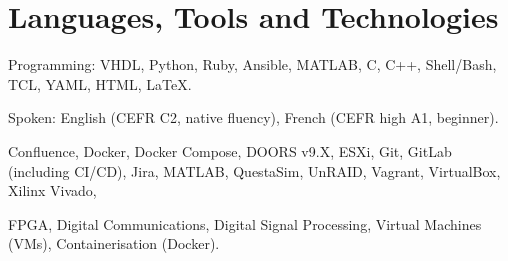%
%
\section{Languages, Tools and Technologies}
\descript{ }
Programming: \hspace{0.5em} VHDL, Python, Ruby, Ansible, MATLAB, C, C++, Shell/Bash, TCL, YAML, HTML, \LaTeX.

Spoken: \hspace{3em} English (CEFR C2, native fluency), French (CEFR high A1, beginner).

\sectionsep{}
\descript{ }
Confluence, Docker, Docker Compose, DOORS v9.X, ESXi, Git, GitLab (including CI/CD), Jira, MATLAB, QuestaSim, UnRAID, Vagrant, VirtualBox, Xilinx Vivado,

\sectionsep{}
\descript{ }
FPGA, Digital Communications, Digital Signal Processing, Virtual Machines (VMs), Containerisation (Docker).

\sectionsep{}
